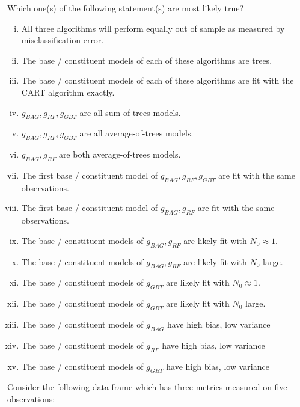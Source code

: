 \documentclass[12pt]{article}
\begin{document}
\begin{enumerate}[(a)]
 Which one(s) of the following statement(s) are most likely true?

\begin{enumerate}[i)]
\item All three algorithms will perform equally out of sample as measured by misclassification error.
\item \iftoggle{solutions}{\inred{TRUE}}{} The base / constituent models of each of these algorithms are trees.
\item The base / constituent models of each of these algorithms are fit with the CART algorithm exactly.
\item $g_{BAG}, g_{RF}, g_{GBT}$ are all sum-of-trees models.
\item $g_{BAG}, g_{RF}, g_{GBT}$ are all average-of-trees models.
\item \iftoggle{solutions}{\inred{TRUE}}{} $g_{BAG}, g_{RF}$ are both average-of-trees models.
\item The first base / constituent model of $g_{BAG}, g_{RF}, g_{GBT}$ are fit with the same observations.
\item The first base / constituent model of $g_{BAG}, g_{RF}$ are fit with the same observations.
\item \iftoggle{solutions}{\inred{TRUE}}{} The base / constituent models of $g_{BAG}, g_{RF}$ are likely fit with $N_0 \approx 1$.
\item The base / constituent models of $g_{BAG}, g_{RF}$ are likely fit with $N_0$ large.
\item The base / constituent models of $g_{GBT}$ are likely fit with $N_0 \approx 1$.
\item \iftoggle{solutions}{\inred{TRUE}}{} The base / constituent models of $g_{GBT}$ are likely fit with $N_0$ large.
\item The base / constituent models of $g_{BAG}$ have high bias, low variance
\item The base / constituent models of $g_{RF}$  have high bias, low variance
\item \iftoggle{solutions}{\inred{TRUE}}{} The base / constituent models of $g_{GBT}$ have high bias, low variance

\end{enumerate}
\end{enumerate}

\problem Consider the following data frame which has three metrics measured on five observations:
\end{document}
